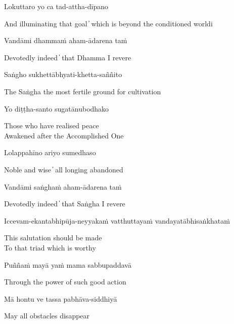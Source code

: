 Lokuttaro yo ca tad-attha-dīpano

\begin{cprenglish}
And illuminating that goal  ̓  which is beyond the conditioned worldi
\end{cprenglish}

Vandāmi dhammaṁ aham-ādarena taṁ

\begin{cprenglish}
Devotedly indeed  ̓  that Dhamma I revere
\end{cprenglish}

Saṅgho sukhettābhyati-khetta-saññito

\begin{cprenglish}
The Saṅgha the most fertile ground for cultivation
\end{cprenglish}

Yo diṭṭha-santo sugatānubodhako

\begin{cprenglish}
Those who have realised peace\\
Awakened after the Accomplished One
\end{cprenglish}

Lolappahīno ariyo sumedhaso

\begin{cprenglish}
Noble and wise  ̓  all longing abandoned
\end{cprenglish}

Vandāmi saṅghaṁ aham-ādarena taṁ

\begin{cprenglish}
Devotedly indeed  ̓  that Saṅgha I revere
\end{cprenglish}

Iccevam-ekantabhipūja-neyyakaṁ vatthuttayaṁ vandayatābhisaṅkhataṁ

\begin{cprenglish}
This salutation should be made\\
To that triad which is worthy
\end{cprenglish}

Puññaṁ mayā yaṁ mama sabbupaddavā

\begin{cprenglish}
Through the power of such good action
\end{cprenglish}

Mā hontu ve tassa pabhāva-siddhiyā

\begin{cprenglish}
May all obstacles disappear
\end{cprenglish}

